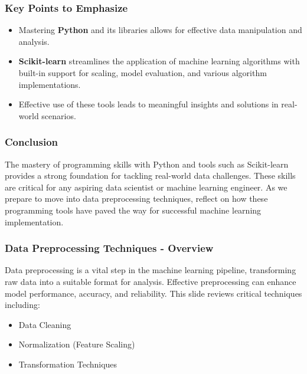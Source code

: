 \documentclass[aspectratio=169]{beamer}
\begin{document}
\begin{frame}[fragile]
    \frametitle{Key Points to Emphasize}
    \begin{itemize}
        \item Mastering \textbf{Python} and its libraries allows for effective data manipulation and analysis.
        \item \textbf{Scikit-learn} streamlines the application of machine learning algorithms with built-in support for scaling, model evaluation, and various algorithm implementations.
        \item Effective use of these tools leads to meaningful insights and solutions in real-world scenarios.
    \end{itemize}
\end{frame}

\begin{frame}[fragile]
    \frametitle{Conclusion}
    The mastery of programming skills with Python and tools such as Scikit-learn provides a strong foundation for tackling real-world data challenges. 
    These skills are critical for any aspiring data scientist or machine learning engineer. 
    As we prepare to move into data preprocessing techniques, reflect on how these programming tools have paved the way for successful machine learning implementation.
\end{frame}

\begin{frame}[fragile]
    \frametitle{Data Preprocessing Techniques - Overview}
    Data preprocessing is a vital step in the machine learning pipeline, transforming raw data into a suitable format for analysis. Effective preprocessing can enhance model performance, accuracy, and reliability. This slide reviews critical techniques including:
    \begin{itemize}
        \item Data Cleaning
        \item Normalization (Feature Scaling)
        \item Transformation Techniques
    \end{itemize}
\end{frame}
\end{document}

